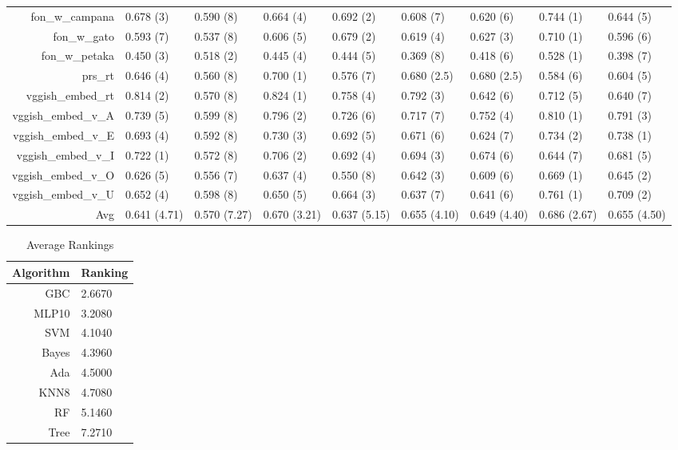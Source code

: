 \documentclass[a4paper,10pt]{article}
\begin{document}
\begin{table}[!htp]
{\begin{tabular}{rllllllll}
fon\_w\_campana&0.678 (3)&0.590 (8)&0.664 (4)&0.692 (2)&0.608 (7)&0.620 (6)&0.744 (1)&0.644 (5)\\
fon\_w\_gato&0.593 (7)&0.537 (8)&0.606 (5)&0.679 (2)&0.619 (4)&0.627 (3)&0.710 (1)&0.596 (6)\\
fon\_w\_petaka&0.450 (3)&0.518 (2)&0.445 (4)&0.444 (5)&0.369 (8)&0.418 (6)&0.528 (1)&0.398 (7)\\
prs\_rt&0.646 (4)&0.560 (8)&0.700 (1)&0.576 (7)&0.680 (2.5)&0.680 (2.5)&0.584 (6)&0.604 (5)\\
vggish\_embed\_rt&0.814 (2)&0.570 (8)&0.824 (1)&0.758 (4)&0.792 (3)&0.642 (6)&0.712 (5)&0.640 (7)\\
vggish\_embed\_v\_A&0.739 (5)&0.599 (8)&0.796 (2)&0.726 (6)&0.717 (7)&0.752 (4)&0.810 (1)&0.791 (3)\\
vggish\_embed\_v\_E&0.693 (4)&0.592 (8)&0.730 (3)&0.692 (5)&0.671 (6)&0.624 (7)&0.734 (2)&0.738 (1)\\
vggish\_embed\_v\_I&0.722 (1)&0.572 (8)&0.706 (2)&0.692 (4)&0.694 (3)&0.674 (6)&0.644 (7)&0.681 (5)\\
vggish\_embed\_v\_O&0.626 (5)&0.556 (7)&0.637 (4)&0.550 (8)&0.642 (3)&0.609 (6)&0.669 (1)&0.645 (2)\\
vggish\_embed\_v\_U&0.652 (4)&0.598 (8)&0.650 (5)&0.664 (3)&0.637 (7)&0.641 (6)&0.761 (1)&0.709 (2)\\
\Xhline{2\arrayrulewidth}
Avg&0.641 (4.71)&0.570 (7.27)&0.670 (3.21)&0.637 (5.15)&0.655 (4.10)&0.649 (4.40)&0.686 (2.67)&0.655 (4.50)\\
\end{tabular}}
\end{table}




\begin{table}[!htp]
\centering
\caption{Average Rankings}
\begin{tabular}{r|l}
Algorithm&Ranking\\
\hline
 GBC & 2.6670 \\
 MLP10 & 3.2080 \\
 SVM & 4.1040 \\
 Bayes & 4.3960 \\
 Ada & 4.5000 \\
 KNN8 & 4.7080 \\
 RF & 5.1460 \\
 Tree & 7.2710 \\
\end{tabular}
\end{table}
\end{document}
